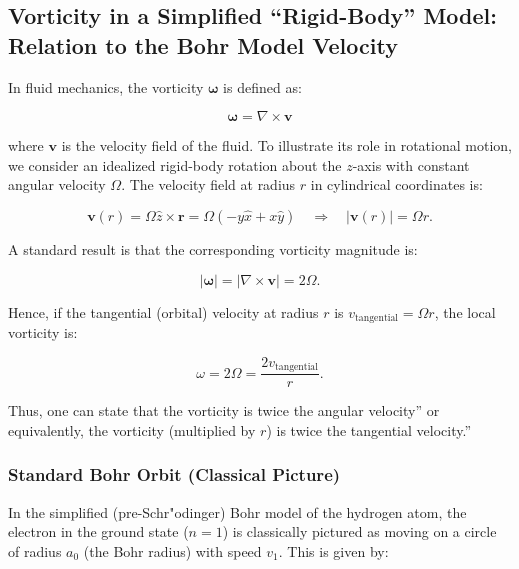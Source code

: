 
\subsection{Vorticity in a Simplified ``Rigid-Body'' Model: Relation to the Bohr Model Velocity}\label{subsec:Relation-to-the-Bohr-Model-Velocity}

In fluid mechanics, the vorticity $\boldsymbol{\omega}$ is defined as:

\begin{equation*}
\boldsymbol{\omega} = \nabla \times \mathbf{v}\label{eq:vorticity}
\end{equation*}

where $\mathbf{v}$ is the velocity field of the fluid. To illustrate its role in rotational motion, we consider an idealized rigid-body rotation about the $z$-axis with constant angular velocity $\Omega$. The velocity field at radius $r$ in cylindrical coordinates is:

\begin{equation*}
\mathbf{v}(r) = \Omega \hat{z} \times \mathbf{r} = \Omega(-y\hat{x} + x\hat{y}) \quad \Rightarrow \quad |
\mathbf{v}(r)| = \Omega r.\label{eq:cylindrical-velocity}
\end{equation*}

A standard result is that the corresponding vorticity magnitude is:

\begin{equation}
|\boldsymbol{\omega}| = \left| \nabla \times \mathbf{v} \right| = 2\Omega.\label{eq:vorticity-magnitude}
\end{equation}

Hence, if the tangential (orbital) velocity at radius $r$ is $v_{\text{tangential}} = \Omega r$, the local vorticity is:

\begin{equation*}
\omega = 2\Omega = \frac{2v_{\text{tangential}}}{r}.\label{eq:2velocity}
\end{equation*}

Thus, one can state that the vorticity is twice the angular velocity'' or equivalently, the vorticity (multiplied by $r$) is twice the tangential velocity.''

\subsubsection*{Standard Bohr Orbit (Classical Picture)}
In the simplified (pre-Schr"odinger) Bohr model of the hydrogen atom, the electron in the ground state ($n=1$) is classically pictured as moving on a circle of radius $a_0$ (the Bohr radius) with speed $v_1$. This is given by:

